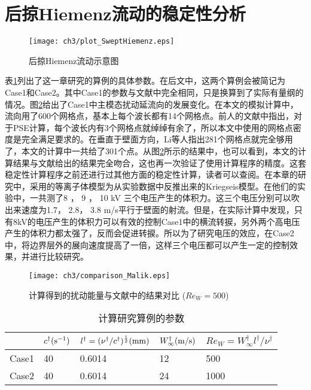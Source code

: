\section{后掠Hiemenz流动的稳定性分析}
\begin{figure}[htb]
  \centering
  \texttt{[image: ch3/plot\_SweptHiemenz.eps]}\\
  \caption{后掠Hiemenz流动示意图}\label{fig:SweptHiemenz}
\end{figure}
表\ref{t:testcase}列出了这一章研究的算例的具体参数。在后文中，这两个算例会被简记为Case1和Case2。其中Case1的参数与文献\cite{Malik1994}中完全相同，只是换算到了实际有量纲的情况。图\ref{f:Com_Malik1994}给出了Case1中主模态扰动延流向的发展变化。在本文的模拟计算中，流向用了600个网格点，基本上每个波长都有14个网格点。前人的文献中指出，对于PSE计算，每个波长内有3个网格点就绰绰有余了\cite{Joslin1992}，所以本文中使用的网格点密度是完全满足要求的。在垂直于壁面方向，Li等人\cite{Li2015a}指出281个网格点就完全够用了，本文的计算中一共给了301个点。从图\ref{f:Com_Malik1994}所示的结果中，也可以看到，本文的计算结果与文献给出的结果完全吻合，这也再一次验证了使用计算程序的精度。这套稳定性计算程序之前还进行过其他方面的稳定性计算，读者可以查阅\cite{Xu2011a,Xu2011b,Ren2014a,Ren2014b,Ren2014c,Ren2015,Ren2016}。在本章的研究中，采用的等离子体模型为从实验数据中反推出来的Kriegseis模型\cite{kriegseis2013velocity}。在他们的实验中，一共测了8 ， 9 ， 10 kV 三个电压产生的体积力。这三个电压分别可以吹出来速度为1.7， 2.8， 3.8 m/s平行于壁面的射流。但是，在实际计算中发现，只有8kV的电压产生的体积力可以有效的控制Case1中的横流转捩，另外两个高电压产生的体积力都太强了，反而会促进转捩。所以为了研究电压的效应，在Case2中，将边界层外的展向速度提高了一倍，这样三个电压都可以产生一定的控制效果，并进行比较研究。
\begin{figure}[htb]
  \centering
  \texttt{[image: ch3/comparison\_Malik.eps]}\\
  \caption{计算得到的扰动能量与文献\cite{Malik1994}中的结果对比 ($Re_W=500$)}\label{f:Com_Malik1994}
\end{figure}
\begin{table}
  \caption{计算研究算例的参数}\label{t:testcase}
  \centering
  \begin{tabular}{p{2.3cm}<{\centering}p{2.5cm}<{\centering}p{3.5cm}<{\centering}p{2.5cm}<{\centering}p{3.5cm}<{\centering}}%
  \toprule[1.5pt]
        & $c^{\dagger}{\rm (s^{-1})}$ & $l^\dagger=(\nu^{\dagger}/c^{\dagger})^{\frac{1}{2}} ({\rm mm})$ & $W_\infty^{\dagger}{\rm (m/s)}$ & $Re_W=W_\infty^{\dagger} l^\dagger/\nu^{\dagger}$ \\
  \midrule[1pt]
  Case1 & 40          & 0.6014            & 12              & 500 \\
  Case2 & 40          & 0.6014            & 24              & 1000 \\
  \bottomrule[1.5pt]
  \end{tabular}

\end{table}

